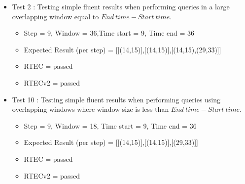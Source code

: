 \documentclass[8pt]{beamer}
\begin{document}
\begin{frame}
    \begin{itemize}
        \item Test 2 : Testing simple fluent results when performing queries in a large overlapping window  equal to $End\ time - Start\ time$.
            \begin{itemize}
                \item Step = 9, Window = 36,Time start = 9, Time end = 36
                \item Expected Result (per step) = [[(14,15)],[(14,15)],[(14,15),(29,33)]]
                \item RTEC = passed
                \item RTECv2 = passed
            \end{itemize}
        \item Test 10 : Testing simple fluent results when performing queries using overlapping windows where window size is less than $End\ time - Start\ time$.
            \begin{itemize}
                \item Step = 9, Window = 18, Time start = 9, Time end = 36
                \item Expected Result (per step) = [[(14,15)],[(14,15)],[(29,33)]]
                \item RTEC = passed
                \item RTECv2 = passed
            \end{itemize}
    \end{itemize}
\end{frame}
\end{document}
